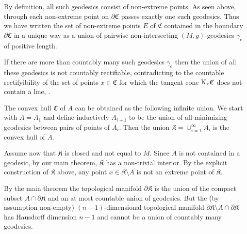 \documentclass[a4paper,10pt]{article}
\begin{document}
 
 By definition, all such geodesics consist of non-extreme points. As seen above, through each non-extreme point on $\partial \mathfrak C$ passes exactly one such geodesics.  Thus we have written the set of non-extreme points $E$  of $\mathfrak C$ contained in the boundary $\partial \mathfrak C$ in a unique way as a union of pairwise non-intersecting $(M,g)$-geodesics $\gamma_e$ 
 of positive length.  
 
 If there are more than countably many such geodesics $\gamma _e$ then the union  of all these geodesics is not countably rectifiable, contradicting to the countable rectifyibility of the set of points  
 $x\in \mathfrak C$ for which the tangent cone $\mathrm{K}_x \mathfrak C$ does not contain a line, \cite{}.
 
   
 
 
 
 
 
 
 \qeds
 
 The convex hull $\mathfrak C$ of $A$ can be obtained as the following infinite union.
 We start with $A=A_1$ and define inductively $A_{i+1}$ to be  the union of all minimizing geodesics between pairs of  points of $A_i$. Then  the union $\mathfrak K= \cup _{i=1}^{\infty} 
 A_i$ is the convex hull of $A$. 
 
 
 Assume now that  $\mathfrak K$ is  closed and not equal to $M$.
 Since $A$ is not contained in a geodesic, by our main theorem, $\mathfrak K$ has a non-trivial interior.   By the explicit construction of $\mathfrak K$ above, any point $x\in \mathfrak K \setminus A$ is not an extreme point of $\mathfrak K$.   
 
 By the main theorem the topological manifold $\partial \mathfrak K$ is the union of the compact subset $A\cap \partial \mathfrak K$ and an at most countable union of geodesics.  But the 
 (by assumption non-empty)  $(n-1)$-dimensional topological manifold $\partial \mathfrak K \setminus A\cap \partial \mathfrak K$ has Hausdorff dimension $n-1$ and  cannot be a union of countably many geodesics.
 
\end{document}
